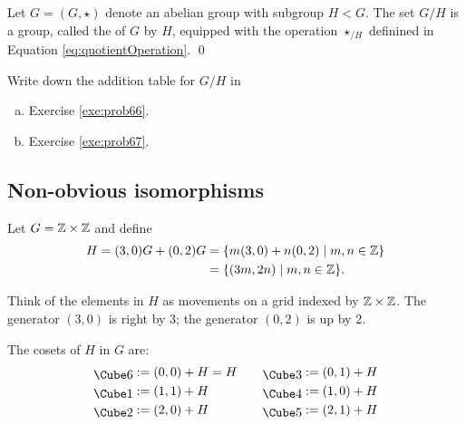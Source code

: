 \documentclass[../algebraNotesMSRI-UP2016.tex]{subfiles}
\begin{document}
\begin{frame}[c]
\begin{thm}\label{thm:quotientGroup}
Let $G=(G,\star)$ denote an abelian group with subgroup $H< G$.  The set $G/H$ is a group, called the  of $G$ by $H$, equipped with the operation $\star_{/H}$ definined in Equation \eqref{eq:quotientOperation}.
\qed
\end{thm}

%
\end{frame}

\begin{frame}[c]
\begin{exe}[cf. Problems 69-70]\label{exe:probs69-70}
Write down the addition table for $G/H$ in 
\begin{enumerate}[(a)]
\item Exercise \ref{exe:prob66}.
\item Exercise \ref{exe:prob67}.
\end{enumerate}
\end{exe}

\end{frame}

\subsection[\subsecname]{Non-obvious isomorphisms}
\begin{frame}{\subsecname}
\begin{ex}\label{ex:isoToZ6}
Let $G=\mathbb Z\times \mathbb Z$ and define 
\begin{align*}
H=(3,0)G+(0,2)G &= \{m(3,0)+n(0,2)\mid m,n\in \mathbb Z\} \\
	&= \{(3m,2n)\mid m,n\in \mathbb Z\}.
\end{align*}
\end{ex}

\smallGap
Think of the elements in $H$ as movements on a grid indexed by $\mathbb Z\times \mathbb Z$.  The generator $(3,0)$ is right by 3; the generator $(0,2)$ is up by 2.  

\smallGap 
The cosets of $H$ in $G$ are: 
\smallGap
\[
\begin{aligned}
\die{6} &:=(0,0)+H=H \\
\die{1} &:=(1,1)+H \\
\die{2} &:=(2,0)+H
\end{aligned} \qquad	
\begin{aligned}
\die{3} &:=(0,1)+H \\
\die{4} &:=(1,0)+H \\
\die{5} &:=(2,1)+H
\end{aligned}
\]
\end{frame}
\end{document}

